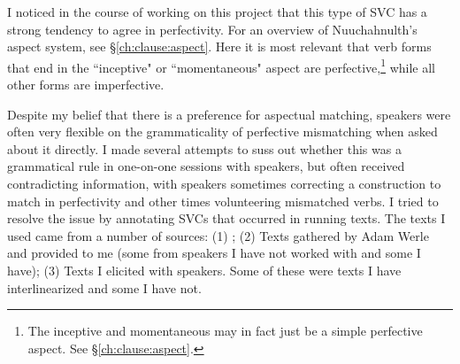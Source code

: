 \begin{comment}
\begin{tikzpicture}[sibling distance=10em,
  every node/.style = {shape=rectangle, align=center}]
\node (aspect) at (0,10) {aspect};
\node (pf) at (1,15) {perfective};
\node (impf) at (1,5) {imperfective};
\node (mo) at (8,15) {momentaneous};
\node (in) at (8,14) {inceptive};
\node (mo-grad-pf) at (8,13) {momentaneous-graduative-perf};
\node (in-grad-pf) at (8,12) {incep-grad-perf};
\node (dr-pf) at (8,11) {durative-perf};
\node (dr-grad-pf) at (8,10) {durative-grad-pf};
\node (rp-pf) at (8,9) {repet-perf};
\node (it-pf) at (8,8) {iter-perf};
\node (ct) at (5,6) {continuative};
\node (dr) at (5,5) {durative};
\node (rp) at (5,4) {repetative};
\node (it) at (5,3) {iterative};
\node (mo-grad) at (5,2) {mo-grad-pf};
\node (in-grad) at (5,1) {in-grad-pf};
\node (dr-grad) at (5,0) {dr-grad-pf};
\draw[->] (aspect) -- (pf);
\draw[->] (aspect) -- (impf);
\draw[->] (pf) -- (mo);
\draw[->] (pf) -- (in);
\draw[->] (pf) -- (mo-grad-pf);
\draw[->] (pf) -- (in-grad-pf);
\draw[->] (pf) -- (dr-pf);
\draw[->] (pf) -- (dr-grad-pf);
\draw[->] (pf) -- (rp-pf);
\draw[->] (pf) -- (it-pf);
\draw[->] (impf) -- (ct);
\draw[->] (impf) -- (dr);
\draw[->] (impf) -- (rp);
\draw[->] (impf) -- (it);
\draw[->] (impf) -- (mo-grad);
\draw[->] (impf) -- (in-grad);
\draw[->] (impf) -- (dr-grad);
\end{tikzpicture}
\end{comment}


I noticed in the course of working on this project that this type of SVC has a strong tendency to agree in perfectivity. For an overview of Nuuchahnulth's aspect system, see \S\ref{ch:clause:aspect}. Here it is most relevant that verb forms that end in the ``inceptive" or ``momentaneous" aspect are perfective,\footnote{The inceptive and momentaneous may in fact just be a simple perfective aspect. See \S\ref{ch:clause:aspect}.} while all other forms are imperfective.

Despite my belief that there is a preference for aspectual matching, speakers were often very flexible on the grammaticality of perfective mismatching when asked about it directly. I made several attempts to suss out whether this was a grammatical rule in one-on-one sessions with speakers, but often received contradicting information, with speakers sometimes correcting a construction to match in perfectivity and other times volunteering mismatched verbs. I tried to resolve the issue by annotating SVCs that occurred in running texts. The texts I used came from a number of sources: (1) \cite{sapir1939}; (2) Texts gathered by Adam Werle and provided to me (some from speakers I have not worked with and some I have); (3) Texts I elicited with speakers. Some of these were texts I have interlinearized and some I have not.

